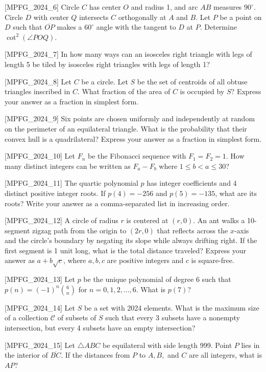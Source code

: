[MPFG_2024_6]
Circle $C$ has center $O$ and radius 1, and arc $AB$ measures $90^\circ$. Circle $D$ with center $Q$ intersects $C$ orthogonally at $A$ and $B$. Let $P$ be a point on $D$ such that $\overline{OP}$ makes a $60^\circ$ angle with the tangent to $D$ at $P$. Determine $\cot^2(\angle POQ)$.

[MPFG_2024_7]
In how many ways can an isosceles right triangle with legs of length 5 be tiled by isosceles right triangles with legs of length 1?

[MPFG_2024_8]
Let $C$ be a circle. Let $S$ be the set of centroids of all obtuse triangles inscribed in $C$. What fraction of the area of $C$ is occupied by $S$? Express your answer as a fraction in simplest form.

[MPFG_2024_9]
Six points are chosen uniformly and independently at random on the perimeter of an equilateral triangle. What is the probability that their convex hull is a quadrilateral? Express your answer as a fraction in simplest form.

[MPFG_2024_10]
Let $F_n$ be the Fibonacci sequence with $F_1=F_2=1$. How many distinct integers can be written as $F_a - F_b$ where $1 \le b < a \le 30$?

[MPFG_2024_11]
The quartic polynomial $p$ has integer coefficients and 4 distinct positive integer roots. If $p(4) = -256$ and $p(5) = -135$, what are its roots? Write your answer as a comma-separated list in increasing order.

[MPFG_2024_12]
A circle of radius $r$ is centered at $(r, 0)$. An ant walks a 10-segment zigzag path from the origin to $(2r, 0)$ that reflects across the $x$-axis and the circle's boundary by negating its slope while always drifting right. If the first segment is 1 unit long, what is the total distance traveled? Express your answer as $a + b\sqrt{c}$, where $a, b, c$ are positive integers and $c$ is square-free.

[MPFG_2024_13]
Let $p$ be the unique polynomial of degree 6 such that $p(n) = (-1)^n \binom{6}{n}$ for $n = 0, 1, 2, \dots, 6$. What is $p(7)$?

[MPFG_2024_14]
Let $S$ be a set with 2024 elements. What is the maximum size of a collection $\mathcal{C}$ of subsets of $S$ such that every 3 subsets have a nonempty intersection, but every 4 subsets have an empty intersection?

[MPFG_2024_15]
Let $\triangle ABC$ be equilateral with side length 999. Point $P$ lies in the interior of $\overline{BC}$. If the distances from $P$ to $A, B,$ and $C$ are all integers, what is $AP$?

